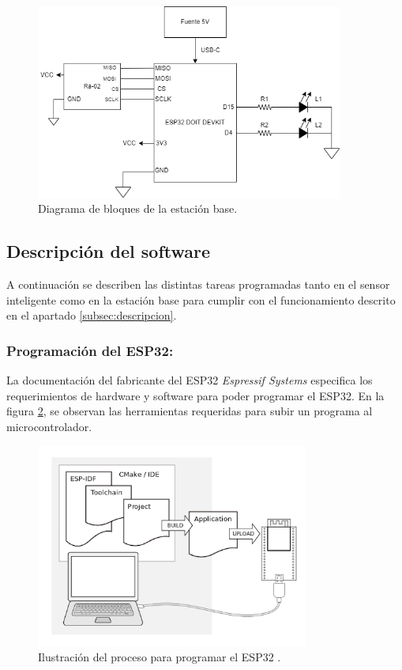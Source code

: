 \begin{figure}[H]
    \centering
    \includegraphics[width = 0.9\textwidth]{imagenes/cap2_marcometod/DiagramaHardwareEstacionBase.png}
    \caption{Diagrama de bloques de la estación base.}
    \label{fig:estacionbbloques}
\end{figure}

\subsection{Descripción del software}
\label{subsec:softwaredesc}

A continuación se describen las distintas tareas programadas tanto en el sensor inteligente como en la estación base para cumplir con el funcionamiento descrito en el apartado \ref{subsec:descripcion}.

\subsubsection{Programación del ESP32:} 

La documentación del fabricante del ESP32 \textit{Espressif Systems} especifica los requerimientos de hardware y software para poder programar el ESP32. En la figura \ref{fig:toolchain}, se observan las herramientas requeridas para subir un programa al microcontrolador. 

\begin{figure}[H]
    \centering
    \includegraphics[width = 0.8\textwidth]{imagenes/cap2_marcometod/Toolchain.png}
    \caption{Ilustración del proceso para programar el ESP32 \citep{datasheetESP32}.}
    \label{fig:toolchain}
\end{figure}

